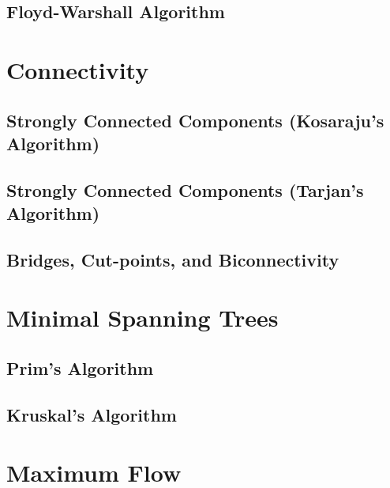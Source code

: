 \subsection{Floyd-Warshall Algorithm}


\section{Connectivity}
\setcounter{section}{3}
\setcounter{subsection}{0}
\subsection{Strongly Connected Components (Kosaraju's Algorithm)}

\subsection{Strongly Connected Components (Tarjan's Algorithm)}

\subsection{Bridges, Cut-points, and Biconnectivity}


\section{Minimal Spanning Trees}
\setcounter{section}{4}
\setcounter{subsection}{0}
\subsection{Prim's Algorithm}

\subsection{Kruskal's Algorithm}


\section{Maximum Flow}
\setcounter{section}{5}
\setcounter{subsection}{0}
